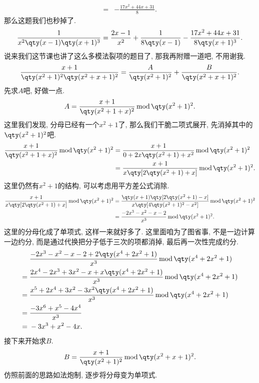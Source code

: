 \documentclass{ctexbook}
\newcommand{\m}{\,\mathrm{mod}\,}
\begin{document}
{\begin{align*}
={}&-\frac{17x^{2}+44x+31}{8}
.\end{align*}
那么这题我们也秒掉了. 
\begin{align*}
\frac{1}{x^{2}\qty(x-1)\qty(x+1)^{3}}=\frac{2x-1}{x^{2}}+\frac{1}{8\qty(x-1)}-\frac{17x^{2}+44x+31}{8\qty(x+1)^{3}}
.\end{align*}
说来我们这节课也讲了这么多模法裂项的题目了, 那我再附赠一道吧, 不用谢我. 
\begin{align*}
\frac{x+1}{\qty(x^{2}+1)^{2}\qty(x^{2}+x+1)^{2}}=\frac{A}{\qty(x^{2}+1)^{2}}+\frac{B}{\qty(x^{2}+x+1)^{2}}
.\end{align*}
先求$A$吧, 好做一点. 
\begin{align*}
A=\frac{x+1}{\qty(x^{2}+1+x)^{2}}\m\qty(x^{2}+1)^{2}
.\end{align*}
这里我们发现, 分母已经有一个$x^{2}+1$了, 那么我们干脆二项式展开, 先消掉其中的$\qty(x^{2}+1)^{2}$吧. 
\begin{align*}
\frac{x+1}{\qty(x^{2}+1+x)^{2}}\m\qty(x^{2}+1)^{2}={}&\frac{x+1}{0+2x\qty(x^{2}+1)+x^{2}}\m\qty(x^{2}+1)^{2}\\
={}&\frac{x+1}{x\qty[2\qty(x^{2}+1)+x]}\m\qty(x^{2}+1)^{2}
.\end{align*}
这里仍然有$x^{2}+1$的结构, 可以考虑用平方差公式消除. 
\begin{align*}
\frac{x+1}{x\qty[2\qty(x^{2}+1)+x]}\m\qty(x^{2}+1)^{2}={}&\frac{\qty(x+1)\qty[2\qty(x^{2}+1)-x]}{x\qty[4\qty(x^{2}+1)^{2}-x^{2}]}\m\qty(x^{2}+1)^{2}\\
={}&\frac{-2x^{3}-x^{2}-x-2}{x^{3}}\m\qty(x^{2}+1)^{2}
.\end{align*}
这里的分母化成了单项式, 这样一来就好多了. 这里面咱为了图省事, 不是一边计算一边约分, 而是通过代换把分子低于三次的项都消掉, 最后再一次性完成约分. 
\begin{align*}
{}&\frac{-2x^{3}-x^{2}-x-2+2\qty(x^{4}+2x^{2}+1)}{x^{3}}\m\qty(x^{4}+2x^{2}+1)\\
={}&\frac{2x^{4}-2x^{3}+3x^{2}-x+x\qty(x^{4}+2x^{2}+1)}{x^{3}}\m\qty(x^{4}+2x^{2}+1)\\
={}&\frac{x^{5}+2x^{4}+3x^{2}-3x^{2}\qty(x^{4}+2x^{2}+1)}{x^{3}}\m\qty(x^{4}+2x^{2}+1)\\
={}&\frac{-3x^{6}+x^{5}-4x^{4}}{x^{3}}\\
={}&-3x^{3}+x^{2}-4x
.\end{align*}
接下来开始求$B$. 
\begin{align*}
B=\frac{x+1}{\qty(x^{2}+1)^{2}}\m\qty(x^{2}+x+1)^{2}
.\end{align*}
仿照前面的思路如法炮制, 逐步将分母变为单项式. 
\begin{align*}

\end{align*}}
\end{document}

